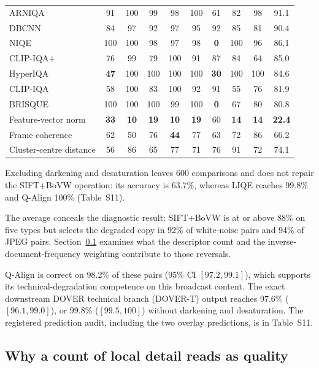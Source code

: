 \begin{table}[!ht]
\begin{tabular}{@{}lccccccccc@{}}
ARNIQA & 91 & 100 & 99 & 98 & 100 & 61 & 82 & 98 & 91.1 \\
DBCNN & 84 & 97 & 92 & 97 & 95 & 92 & 85 & 81 & 90.4 \\
NIQE & 100 & 100 & 98 & 97 & 98 & \textcolor{accentred}{\textbf{0}} & 100 & 96 & 86.1 \\
CLIP-IQA$+$ & 76 & 99 & 79 & 100 & 91 & 87 & 84 & 64 & 85.0 \\
HyperIQA & \textcolor{accentred}{\textbf{47}} & 100 & 100 & 100 & 100 & \textcolor{accentred}{\textbf{30}} & 100 & 100 & 84.6 \\
CLIP-IQA & 58 & 100 & 83 & 100 & 92 & 91 & 55 & 76 & 81.9 \\
BRISQUE & 100 & 100 & 100 & 99 & 100 & \textcolor{accentred}{\textbf{0}} & 67 & 80 & 80.8 \\
\midrule
Feature-vector norm & \textcolor{accentred}{\textbf{33}} & \textcolor{accentred}{\textbf{10}} & \textcolor{accentred}{\textbf{19}} & \textcolor{accentred}{\textbf{10}} & \textcolor{accentred}{\textbf{19}} & 60 & \textcolor{accentred}{\textbf{14}} & \textcolor{accentred}{\textbf{14}} & \textcolor{accentred}{\textbf{22.4}} \\
Frame coherence & 62 & 50 & 76 & \textcolor{accentred}{\textbf{44}} & 77 & 63 & 72 & 86 & 66.2 \\
Cluster-centre distance & 56 & 86 & 65 & 77 & 71 & 76 & 91 & 72 & 74.1 \\
\bottomrule
\end{tabular}
\end{table}

Excluding darkening and desaturation leaves 600
comparisons and does not repair the SIFT+BoVW operation: its accuracy is 63.7\%,
whereas LIQE reaches 99.8\% and Q-Align 100\% (Table~S11). 

The average conceals the diagnostic result: SIFT+BoVW is at or above 88\% on five
types but selects the degraded copy in 92\% of white-noise pairs and 94\% of JPEG pairs.
Section~\ref{sec:mechanism} examines what the descriptor count and the
inverse-document-frequency weighting contribute to those reversals.

Q-Align is correct on 98.2\% of these pairs (95\% CI $[97.2,99.1]$), which
supports its technical-degradation competence on this broadcast content. The exact downstream DOVER technical branch (DOVER-T) output
reaches 97.6\% ($[96.1,99.0]$), or 99.8\% ($[99.5,100]$) without darkening and
desaturation. The registered prediction audit, including the two overlay predictions, is in Table~S11.
\subsection{Why a count of local detail reads as quality}\label{sec:mechanism}

